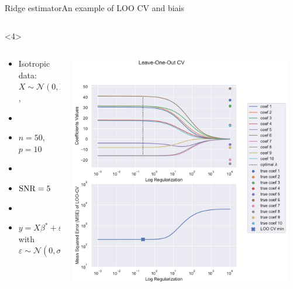 \documentclass[10pt,aspectratio=43]{beamer}
\begin{document}
\begin{frame}{Ridge estimator}{An example of LOO CV and biais}
\begin{onlyenv}
\begin{columns}
\begin{column}{0.7\textwidth}
\begin{center}
                 \end{center}
            \end{column}
            \end{columns}
    \end{onlyenv}
    \begin{onlyenv}<4>
        \begin{columns}
            \begin{column}{0.4\textwidth}
                \begin{itemize}
                    \item Isotropic data: $X\sim\mathcal{N}(0,\mathrm{Id})$,
                    \item[]
                    \item $n=50$, $p=10$
                    \item[]
                    \item \textcolor{red}{$\operatorname{SNR}=5$}
                    \item[]
                    \item $y = X\beta^*+\varepsilon$ with $\varepsilon\sim \mathcal{N}(0, \sigma^2\mathrm{Id})$
                \end{itemize}
            \end{column}
            \begin{column}{0.7\textwidth}
                \begin{center}
                        \includegraphics[width=0.95\textwidth]{path_ridge_complete_5_.pdf}

\end{center}
\end{column}
\end{columns}
\end{onlyenv}
\end{frame}
\end{document}
